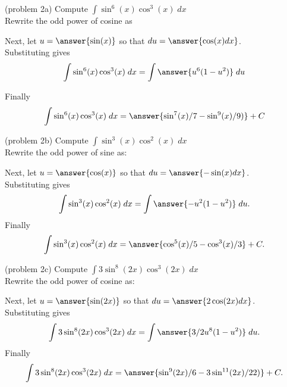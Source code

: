 \documentclass{ximera}
\begin{document}
\begin{problem}{\color{gray}(problem 2a)}
Compute $\displaystyle{\int \sin^6(x)\cos^3(x) \; dx}$\\
Rewrite the odd power of cosine as
\begin{multipleChoice}
\end{multipleChoice}

Next, let $u = \answer{\sin(x)}$ so that $du = \answer{\cos(x) dx}$.\\

Substituting gives 
\[
\int \sin^6(x)\cos^3(x) \; dx= \int \answer{u^6(1-u^2)} \; du
\]

Finally 
\[
\int \sin^6(x)\cos^3(x) \; dx= \answer{\sin^7(x)/7 - \sin^9(x)/9)} + C
\]

\end{problem}


\begin{problem}{\color{gray}(problem 2b)} Compute $\displaystyle{\int \sin^3(x)\cos^2(x) \; dx}$\\
Rewrite the odd power of sine as:
\begin{multipleChoice}

\end{multipleChoice}

Next, let $u = \answer{\cos(x)}$ so that $du = \answer{-\sin(x) dx}$.\\
Substituting gives
\[
\int \sin^3(x)\cos^2(x) \; dx= \int \answer{-u^2(1-u^2)} \; du.
\]
Finally
\[
\int \sin^3(x)\cos^2(x) \; dx= \answer{\cos^5(x)/5 - \cos^3(x)/3} + C.
\]
\end{problem}



\begin{problem}{\color{gray}(problem 2c)}
Compute $\displaystyle{\int 3\sin^8(2x)\cos^3(2x) \; dx}$\\

Rewrite the odd power of cosine as:
\begin{multipleChoice}

\end{multipleChoice}

Next, let $u = \answer{\sin(2x)}$ so that $du = \answer{2\cos(2x) dx}$.\\
Substituting gives
\[
\int 3\sin^8(2x)\cos^3(2x) \; dx= \int \answer{3/2 u^8(1-u^2)} \; du.
\]
Finally
\[
\int 3\sin^8(2x)\cos^3(2x) \; dx= \answer{\sin^9(2x)/6 - 3 \sin^{11}(2x)/22)} + C.
\]
\end{problem}
\end{document}
